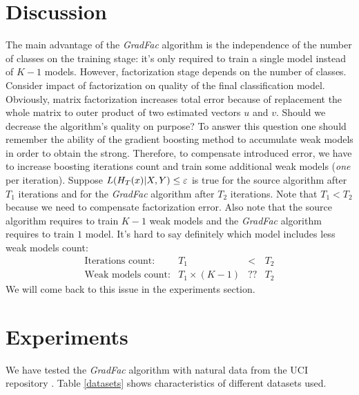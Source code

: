\documentclass{article}
\begin{document}
\section{Discussion}
The main advantage of the \emph{GradFac} algorithm is the independence of the number of classes on the training stage: it's only required to train a single model instead of $K-1$ models. However, factorization stage depends on the number of classes. 
Consider impact of factorization on quality of the final classification model. Obviously, matrix factorization increases total error because of replacement the whole matrix to outer product of two estimated vectors $u$ and $v$. Should we decrease the algorithm's quality on purpose? To answer this question one should remember the ability of the gradient boosting method to accumulate weak models in order to obtain the strong. Therefore, to compensate introduced error, we have to increase boosting iterations count and train some additional weak models (\emph{one} per iteration). 
Suppose $L(H_{T}(x) \arrowvert X,Y) \le \varepsilon$ is true for the source algorithm after $T_{1}$ iterations and for the \emph{GradFac} algorithm after $T_{2}$ iterations. Note that $T_{1}<T_{2}$ because we need to compensate factorization error. Also note that the source algorithm requires to train $K-1$ weak models and the \emph{GradFac} algorithm requires to train $1$ model. It's hard to say definitely which model includes less weak models count: 
\[
\begin{array}{rccc}
	\text{Iterations count:}	& T_{1} 				& <		& T_{2} \\
	\text{Weak models count:}	& T_{1}\times(K-1) 		& ??	& T_{2}
\end{array}
\]
We will come back to this issue in the experiments section.

\section{Experiments} \label{experiments}
We have tested the \emph{GradFac} algorithm with natural data from the UCI repository \cite{uciRepo}. Table \ref{datasets} shows characteristics of different datasets used.
\end{document}
